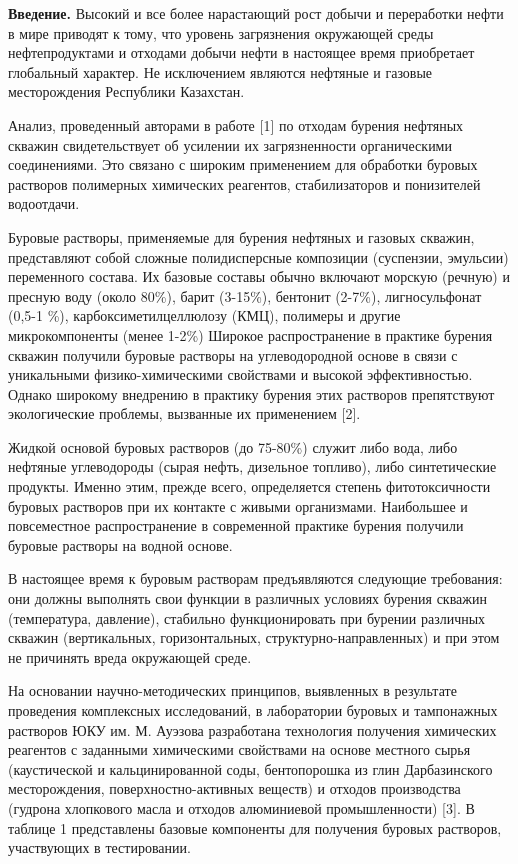 \begin{multicols}{2}
{\bfseries Введение.} Высокий и все более нарастающий рост добычи и
переработки нефти в мире приводят к тому, что уровень загрязнения
окружающей среды нефтепродуктами и отходами добычи нефти в настоящее
время приобретает глобальный характер. Не исключением являются нефтяные
и газовые месторождения Республики Казахстан.

Анализ, проведенный авторами в работе {[}1{]} по отходам бурения
нефтяных скважин свидетельствует об усилении их загрязненности
органическими соединениями. Это связано с широким применением для
обработки буровых растворов полимерных химических реагентов,
стабилизаторов и понизителей водоотдачи.

Буровые растворы, применяемые для бурения нефтяных и газовых скважин,
представляют собой сложные полидисперсные композиции (суспензии,
эмульсии) переменного состава. Их базовые составы обычно включают
морскую (речную) и пресную воду (около 80\%), барит (3-15\%), бентонит
(2-7\%), лигносульфонат (0,5-1 \%), карбоксиметилцеллюлозу (КМЦ),
полимеры и другие микрокомпоненты (менее 1-2\%) Широкое распространение
в практике бурения скважин получили буровые растворы на углеводородной
основе в связи с уникальными физико-химическими свойствами и высокой
эффективностью. Однако широкому внедрению в практику бурения этих
растворов препятствуют экологические проблемы, вызванные их применением
{[}2{]}.

Жидкой основой буровых растворов (до 75-80\%) служит либо вода, либо
нефтяные углеводороды (сырая нефть, дизельное топливо), либо
синтетические продукты. Именно этим, прежде всего, определяется степень
фитотоксичности буровых растворов при их контакте с живыми организмами.
Наибольшее и повсеместное распространение в современной практике бурения
получили буровые растворы на водной основе.

В настоящее время к буровым растворам предъявляются следующие
требования: они должны выполнять свои функции в различных условиях
бурения скважин (температура, давление), стабильно функционировать при
бурении различных скважин (вертикальных, горизонтальных,
структурно-направленных) и при этом не причинять вреда окружающей среде.

На основании научно-методических принципов, выявленных в результате
проведения комплексных исследований, в лаборатории буровых и тампонажных
растворов ЮКУ им. М. Ауэзова разработана технология получения химических
реагентов с заданными химическими свойствами на основе местного сырья
(каустической и кальцинированной соды, бентопорошка из глин
Дарбазинского месторождения, поверхностно-активных веществ) и отходов
производства (гудрона хлопкового масла и отходов алюминиевой
промышленности) {[}3{]}. В таблице 1 представлены базовые компоненты для
получения буровых растворов, участвующих в тестировании.
\end{multicols}

